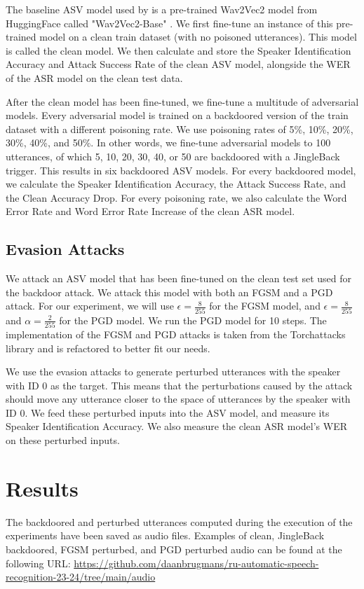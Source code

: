 \documentclass[11pt]{article}
\begin{document}
The baseline ASV model used by \citeauthor{roddeman2024anonymization} is a pre-trained Wav2Vec2 model \citep{baevski2020wav2vec2} from HuggingFace called "Wav2Vec2-Base" \citep{facebook2021huggingface}.
We first fine-tune an instance of this pre-trained model on a clean train dataset (with no poisoned utterances).
This model is called the clean model.
We then calculate and store the Speaker Identification Accuracy and Attack Success Rate of the clean ASV model, alongside the WER of the ASR model on the clean test data.

After the clean model has been fine-tuned, we fine-tune a multitude of adversarial models.
Every adversarial model is trained on a backdoored version of the train dataset with a different poisoning rate.
We use poisoning rates of 5\%, 10\%, 20\%, 30\%, 40\%, and 50\%.
In other words, we fine-tune adversarial models to 100 utterances, of which 5, 10, 20, 30, 40, or 50 are backdoored with a JingleBack trigger.
This results in six backdoored ASV models.
For every backdoored model, we calculate the Speaker Identification Accuracy, the Attack Success Rate, and the Clean Accuracy Drop.
For every poisoning rate, we also calculate the Word Error Rate and Word Error Rate Increase of the clean ASR model.

\subsection{Evasion Attacks}
We attack an ASV model that has been fine-tuned on the clean test set used for the backdoor attack.
We attack this model with both an FGSM \citep{goodfellow2015explaining} and a PGD \citep{madry2018towards} attack.
For our experiment, we will use $\epsilon = \frac{8}{255}$ for the FGSM model, and $\epsilon = \frac{8}{255}$ and $\alpha = \frac{2}{255}$ for the PGD model.
We run the PGD model for 10 steps.
The implementation of the FGSM and PGD attacks is taken from the Torchattacks \citep{kim2020torchattacks} library and is refactored to better fit our needs.

We use the evasion attacks to generate perturbed utterances with the speaker with ID 0 as the target.
This means that the perturbations caused by the attack should move any utterance closer to the space of utterances by the speaker with ID 0.
We feed these perturbed inputs into the ASV model, and measure its Speaker Identification Accuracy.
We also measure the clean ASR model's WER on these perturbed inputs.

\section{Results}
The backdoored and perturbed utterances computed during the execution of the experiments have been saved as audio files.
Examples of clean, JingleBack backdoored, FGSM perturbed, and PGD perturbed audio can be found at the following URL: \url{https://github.com/daanbrugmans/ru-automatic-speech-recognition-23-24/tree/main/audio}
\end{document}
